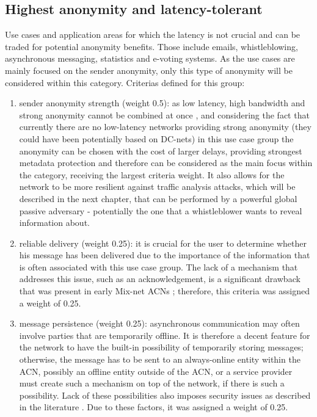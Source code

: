 \subsection{Highest anonymity and latency-tolerant}
Use cases and application areas for which the latency is not crucial and can be traded for potential anonymity benefits. Those include emails, whistleblowing, asynchronous messaging, statistics and e-voting systems.
As the use cases are mainly focused on the sender anonymity, only this type of anonymity will be considered within this category.
Criterias defined for this group:
\begin{enumerate}
    \item  sender anonymity strength (weight 0.5): as low latency, high bandwidth and strong anonymity cannot be combined at once \cite{anonymity-trillema}, and considering the fact that currently there are no low-latency networks providing strong anonymity (they could have been potentially based on DC-nets) in this use case group the anonymity can be chosen with the cost of larger delays, providing strongest metadata protection and therefore can be considered as the main focus within the category, receiving the largest criteria weight. It also allows for the network to be more resilient against traffic analysis attacks, which will be described in the next chapter, that can be performed by a powerful global passive adversary - potentially the one that a whistleblower wants to reveal information about.
    \item reliable delivery (weight 0.25): it is crucial for the user to determine whether his message has been delivered due to the importance of the information that is often associated with this use case group. The lack of a mechanism that addresses this issue, such as an acknowledgement, is a significant drawback that was present in early Mix-net ACNs \cite{mix-net-reliability}; therefore, this criteria was assigned a weight of 0.25.
    \item message persistence (weight 0.25): asynchronous communication may often involve parties that are temporarily offline. It is therefore a decent feature for the network to have the built-in possibility of temporarily storing messages; otherwise, the message has to be sent to an always-online entity within the ACN, possibly an offline entity outside of the ACN, or a service provider must create such a mechanism on top of the network, if there is such a possibility. Lack of these possibilities also imposes security issues as described in the literature \cite{two-cents-post-office}. Due to these factors, it was assigned a weight of 0.25.
\end{enumerate}

